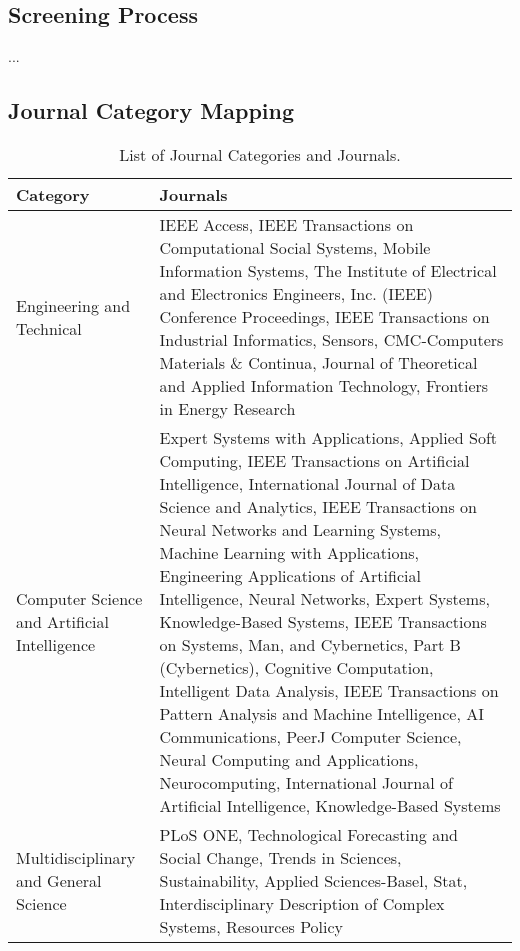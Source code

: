 \subsection{Screening Process}
\label{appendix:screening_process_with_ai}

...

\subsection{Journal Category Mapping}
\label{appendix:journal_category_mapping}
\begin{table}[H]
    \centering
    \caption[Journal Categories Mapping]{List of Journal Categories and Journals.}
    \label{table:journal_categories}
    \small
    \begin{adjustbox}{width=1\textwidth,center}
    \begin{tabular}{lp{}}
        \toprule
        \textbf{Category} & \textbf{Journals} \\
        \midrule
        Engineering and Technical & IEEE Access, IEEE Transactions on Computational Social Systems, Mobile Information Systems, The Institute of Electrical and Electronics Engineers, Inc. (IEEE) Conference Proceedings, IEEE Transactions on Industrial Informatics, Sensors, CMC-Computers Materials \& Continua, Journal of Theoretical and Applied Information Technology, Frontiers in Energy Research \\
        \addlinespace
        \hdashline[0.2pt/3pt]
        \addlinespace
        Computer Science and Artificial Intelligence & Expert Systems with Applications, Applied Soft Computing, IEEE Transactions on Artificial Intelligence, International Journal of Data Science and Analytics, IEEE Transactions on Neural Networks and Learning Systems, Machine Learning with Applications, Engineering Applications of Artificial Intelligence, Neural Networks, Expert Systems, Knowledge-Based Systems, IEEE Transactions on Systems, Man, and Cybernetics, Part B (Cybernetics), Cognitive Computation, Intelligent Data Analysis, IEEE Transactions on Pattern Analysis and Machine Intelligence, AI Communications, PeerJ Computer Science, Neural Computing and Applications, Neurocomputing, International Journal of Artificial Intelligence, Knowledge-Based Systems \\
        \addlinespace
        \hdashline[0.2pt/3pt]
        \addlinespace
        Multidisciplinary and General Science & PLoS ONE, Technological Forecasting and Social Change, Trends in Sciences, Sustainability, Applied Sciences-Basel, Stat, Interdisciplinary Description of Complex Systems, Resources Policy \\

\end{tabular}
\end{adjustbox}
\end{table}
